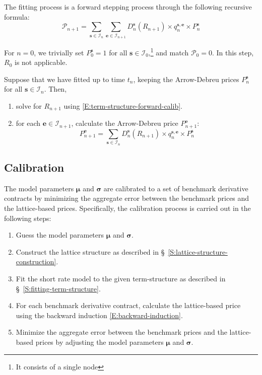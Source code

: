 \documentclass{texyise}
\newcommand{\indexset}{\mathcal{I}}
\begin{document}
The fitting process is a forward stepping process through the following recursive formula: 
\begin{equation}
    \mathcal{P}_{n+1} =  \sum_{\bm{s} \in \indexset_n}\sum_{\bm{e} \in \indexset_{n+1}} D_n^{\bm{s}}(R_{n+1}) \times q_{n}^{\bm{s},\bm{e}} \times P_n^{\bm{s}} \label{E:term-structure-forward-calib}
\end{equation}

For $n=0$, we trivially set $P_0^{\bm{s}} = 1$ for all $\bm{s} \in \indexset_0$,\footnote{It consists of a single node} and match $\mathcal{P}_0 = 0$. In this step, $R_0$ is not applicable.

Suppose that we have fitted up to time $t_n$, keeping the Arrow-Debreu prices $P_n^{\bm{s}}$ for all $\bm{s} \in \indexset_n$. Then,
\begin{enumerate}
    \item solve for $R_{n+1}$ using \eqref{E:term-structure-forward-calib}. 
    \item for each $\bm{e} \in \indexset_{n+1}$, calculate the Arrow-Debreu price $P_{n+1}^{\bm{e}}$:
    \begin{equation}
        P_{n+1}^{\bm{e}} = \sum_{\bm{s} \in \indexset_n} D_n^{\bm{s}}(R_{n+1}) \times q_{n}^{\bm{s},\bm{e}} \times P_n^{\bm{s}}
    \end{equation}
\end{enumerate}

\subsection{Calibration}

The model parameters $\bm{\mu}$ and $\bm{\sigma}$ are calibrated to a set of benchmark derivative contracts by minimizing the aggregate error between the benchmark prices and the lattice-based prices.
Specifically, the calibration process is carried out in the following steps:
\begin{enumerate}
    \item Guess the model parameters $\bm{\mu}$ and $\bm{\sigma}$.
    \item Construct the lattice structure as described in \S~\ref{S:lattice-structure-construction}.
    \item Fit the short rate model to the given term-structure as described in \S~\ref{S:fitting-term-structure}.
    \item For each benchmark derivative contract, calculate the lattice-based price using the backward induction \eqref{E:backward-induction}.
    \item Minimize the aggregate error between the benchmark prices and the lattice-based prices by adjusting the model parameters $\bm{\mu}$ and $\bm{\sigma}$.
\end{enumerate}
\end{document}
